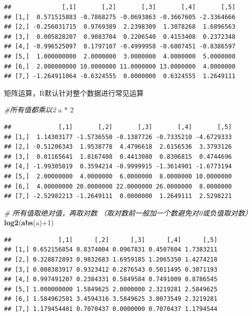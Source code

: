 \documentclass[]{article}
\newenvironment{Shaded}{\begin{snugshade}}{\end{snugshade}}
\newcommand{\KeywordTok}[1]{\textcolor[rgb]{0.13,0.29,0.53}{\textbf{{#1}}}}
\newcommand{\DecValTok}[1]{\textcolor[rgb]{0.00,0.00,0.81}{{#1}}}
\newcommand{\StringTok}[1]{\textcolor[rgb]{0.31,0.60,0.02}{{#1}}}
\newcommand{\CommentTok}[1]{\textcolor[rgb]{0.56,0.35,0.01}{\textit{{#1}}}}
\newcommand{\NormalTok}[1]{{#1}}
\numberwithin{figure}{section}
\numberwithin{table}{section}
\theoremstyle{definition}
\theoremstyle{definition}
\theoremstyle{definition}
\theoremstyle{remark}
\begin{document}
\begin{verbatim}
##              [,1]       [,2]       [,3]       [,4]       [,5]
## [1,]  0.571515883 -0.7868275 -0.0693863 -0.3667605 -2.3364666
## [2,] -0.256031715  0.9769389  2.2398309  1.3078268  1.6896563
## [3,]  0.005828207  0.9083704  0.2206540  0.4153408  0.2372348
## [4,] -0.996525097  0.1797107 -0.4999958 -0.6807451 -0.8386597
## [5,]  1.000000000  2.0000000  3.0000000  4.0000000  5.0000000
## [6,]  2.000000000 10.0000000 11.0000000 13.0000000  4.0000000
## [7,] -1.264911064 -0.6324555  0.0000000  0.6324555  1.2649111
\end{verbatim}

矩阵运算，R默认针对整个数据进行常见运算

\begin{Shaded}
\begin{Highlighting}[]
\CommentTok{#所有值都乘以2}
\NormalTok{a *}\StringTok{ }\DecValTok{2}
\end{Highlighting}
\end{Shaded}

\begin{verbatim}
##             [,1]       [,2]       [,3]       [,4]       [,5]
## [1,]  1.14303177 -1.5736550 -0.1387726 -0.7335210 -4.6729333
## [2,] -0.51206343  1.9538778  4.4796618  2.6156536  3.3793126
## [3,]  0.01165641  1.8167408  0.4413080  0.8306815  0.4744696
## [4,] -1.99305019  0.3594214 -0.9999915 -1.3614901 -1.6773194
## [5,]  2.00000000  4.0000000  6.0000000  8.0000000 10.0000000
## [6,]  4.00000000 20.0000000 22.0000000 26.0000000  8.0000000
## [7,] -2.52982213 -1.2649111  0.0000000  1.2649111  2.5298221
\end{verbatim}

\begin{Shaded}
\begin{Highlighting}[]
\CommentTok{# 所有值取绝对值，再取对数 （取对数前一般加一个数避免对0或负值取对数）}
\KeywordTok{log2}\NormalTok{(}\KeywordTok{abs}\NormalTok{(a)+}\DecValTok{1}\NormalTok{)}
\end{Highlighting}
\end{Shaded}

\begin{verbatim}
##             [,1]      [,2]      [,3]      [,4]      [,5]
## [1,] 0.652156854 0.8374004 0.0967831 0.4507604 1.7383211
## [2,] 0.328872893 0.9832683 1.6959185 1.2065350 1.4274218
## [3,] 0.008383917 0.9323412 0.2876543 0.5011495 0.3071193
## [4,] 0.997491207 0.2384331 0.5849584 0.7491009 0.8786545
## [5,] 1.000000000 1.5849625 2.0000000 2.3219281 2.5849625
## [6,] 1.584962501 3.4594316 3.5849625 3.8073549 2.3219281
## [7,] 1.179454401 0.7070437 0.0000000 0.7070437 1.1794544
\end{verbatim}
\end{document}
